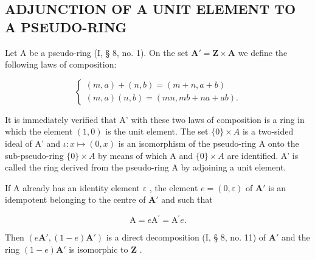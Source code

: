 \subsection{ADJUNCTION OF A UNIT ELEMENT TO A PSEUDO-RING}

Let A be a pseudo-ring (I, § 8, no. 1). On the set \(\mathbf{A}' = \mathbf{Z} \times \mathbf{A}\) we define the following laws of composition:

\[
\left\{ \begin{array}{l} (m, a) + (n, b) = (m + n, a + b) \\ (m, a) (n, b) = (m n, m b + n a + a b). \end{array} \right.\tag{1}
\]

It is immediately verified that A' with these two laws of composition is a ring in which the element \((1,0)\) is the unit element. The set \(\{0\} \times A\) is a two-sided ideal of A' and \(\iota: x \mapsto (0, x)\) is an isomorphism of the pseudo-ring A onto the sub-pseudo-ring \(\{0\} \times A\) by means of which A and \(\{0\} \times A\) are identified. A' is called the ring derived from the pseudo-ring A by adjoining a unit element.

If A already has an identity element \(\varepsilon\) , the element \(e = (0, \varepsilon)\) of \(\mathbf{A}'\) is an idempotent belonging to the centre of \(\mathbf{A}'\) and such that

\[
\mathrm{A} = e \mathrm{A} ^ {\prime} = \mathrm{A} ^ {\prime} e.
\]

Then \((e\mathbf{A}', (1 - e)\mathbf{A}')\) is a direct decomposition (I, § 8, no. 11) of \(\mathbf{A}'\) and the ring \((1 - e)\mathbf{A}'\) is isomorphic to \(\mathbf{Z}\) .

